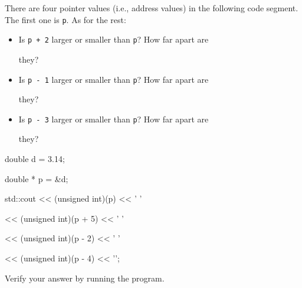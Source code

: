 There are four pointer values (i.e., address values) in the following code segment. The first one is \texttt{p}. As for the rest:



\begin{itemize}

\item Is \texttt{p + 2} larger or smaller than \texttt{p}? How far apart are

  they?

\item Is \texttt{p - 1} larger or smaller than \texttt{p}? How far apart are

  they?

\item Is \texttt{p - 3} larger or smaller than \texttt{p}? How far apart are

  they?

\end{itemize}



\begin{consolethree}[escapeinside=||]

double d = 3.14;

double * p = &d;

std::cout << (unsigned int)(p) << ' '

          << (unsigned int)(p + 5) << ' '

          << (unsigned int)(p - 2) << ' '

          << (unsigned int)(p - 4) << '\n';

\end{consolethree}



Verify your answer by running the program.

